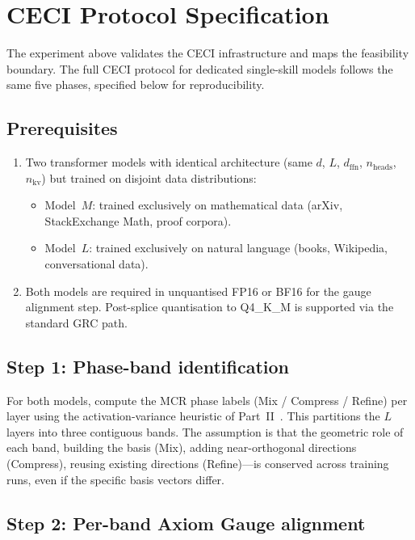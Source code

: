 \documentclass[11pt]{article}
\begin{document}
\section{CECI Protocol Specification}
\label{sec:protocol}

The experiment above validates the CECI infrastructure and maps the
feasibility boundary.  The full CECI protocol for dedicated single-skill
models follows the same five phases, specified below for reproducibility.

\subsection{Prerequisites}

\begin{enumerate}
\item Two transformer models with identical architecture (same $d$,
      $L$, $d_\mathrm{ffn}$, $n_\mathrm{heads}$, $n_\mathrm{kv}$)
      but trained on disjoint data distributions:
      \begin{itemize}
      \item Model~$M$: trained exclusively on mathematical data
            (arXiv, StackExchange Math, proof corpora).
      \item Model~$L$: trained exclusively on natural language
            (books, Wikipedia, conversational data).
      \end{itemize}
\item Both models are required in unquantised FP16 or BF16 for the
      gauge alignment step.  Post-splice quantisation to Q4\_K\_M is
      supported via the standard GRC path.
\end{enumerate}

\subsection{Step 1: Phase-band identification}

For both models, compute the MCR phase labels (Mix / Compress /
Refine) per layer using the activation-variance heuristic of
Part~II~\cite{stewart2026gp}.  This partitions the $L$ layers into
three contiguous bands.  The assumption is that the geometric role of
each band, building the basis (Mix), adding near-orthogonal directions
(Compress), reusing existing directions (Refine)---is conserved across
training runs, even if the specific basis vectors differ.

\subsection{Step 2: Per-band Axiom Gauge alignment}
\end{document}
